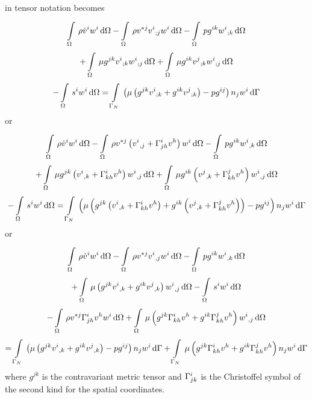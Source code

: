  in tensor notation becomes
\begin{multline}
  \gint{\Omega}{}{\rho\dot{v}^{i}w^{i}}{\Omega}
 -\gint{\Omega}{}{\rho v^{*j}\covarderiv{v^{i}}{j}w^{i}}{\Omega}
 -\gint{\Omega}{}{pg^{ik}\covarderiv{w^{i}}{k}}{\Omega}\\
 +\gint{\Omega}{}{{\mu}g^{jk}\covarderiv{v^{i}}{k}\covarderiv{w^{i}}{j}}{\Omega}
 +\gint{\Omega}{}{{\mu}g^{ik}\covarderiv{v^{j}}{k}\covarderiv{w^{i}}{j}}{\Omega}\\
 -\gint{\Omega}{}{s^{i}w^{i}}{\Omega}
 =\gint{\Gamma_N}{}{\pbrac{\mu\pbrac{g^{jk}\covarderiv{v^{i}}{k}+g^{ik}\covarderiv{v^{j}}{k}}-pg^{ij}}n_{j}w^{i}}{\Gamma}
 \label{eqn:TensorStokesEquation}
\end{multline}
or
\begin{multline}
  \gint{\Omega}{}{\rho\dot{v}^{i}w^{i}}{\Omega}
 -\gint{\Omega}{}{\rho v^{*j}\pbrac{\partialderiv{v^{i}}{j}+\christoffel{i}{j}{h}v^{h}}w^{i}}{\Omega}
 -\gint{\Omega}{}{pg^{ik}\partialderiv{w^{i}}{k}}{\Omega}\\
 +\gint{\Omega}{}{{\mu}g^{jk}\pbrac{\partialderiv{v^{i}}{k}+\christoffel{i}{k}{h}v^{h}}\partialderiv{w^{i}}{j}}{\Omega}
 +\gint{\Omega}{}{{\mu}g^{ik}\pbrac{\partialderiv{v^{j}}{k}+\christoffel{j}{k}{h}v^{h}}\partialderiv{w^{i}}{j}}{\Omega}\\
 -\gint{\Omega}{}{s^{i}w^{i}}{\Omega}
 =\gint{\Gamma_N}{}{\pbrac{\mu\pbrac{g^{jk}\pbrac{\partialderiv{v^{i}}{k}+\christoffel{i}{k}{h}v^{h}}+g^{ik}\pbrac{\partialderiv{v^{j}}{k}+\christoffel{j}{k}{h}v^{h}}}-pg^{ij}}n_{j}w^{i}}{\Gamma}
 \label{eqn:Tensor2StokesEquation}
\end{multline}
or
\begin{multline}
  \gint{\Omega}{}{\rho\dot{v}^{i}w^{i}}{\Omega}
 -\gint{\Omega}{}{\rho v^{*j}\partialderiv{v^{i}}{j}w^{i}}{\Omega}
 -\gint{\Omega}{}{pg^{ik}\partialderiv{w^{i}}{k}}{\Omega}\\
 +\gint{\Omega}{}{\mu\pbrac{g^{jk}\partialderiv{v^{i}}{k}+g^{ik}\partialderiv{v^{j}}{k}}\partialderiv{w^{i}}{j}}{\Omega}
 -\gint{\Omega}{}{s^{i}w^{i}}{\Omega} \\
 -\gint{\Omega}{}{\rho v^{*j}\christoffel{i}{j}{h}v^{h}w^{i}}{\Omega}
 +\gint{\Omega}{}{\mu\pbrac{g^{jk}\christoffel{i}{k}{h}v^{h}+
     g^{ik}\christoffel{j}{k}{h}v^{h}}\partialderiv{w^{i}}{j}}{\Omega}\\
 =\gint{\Gamma_N}{}{\pbrac{\mu\pbrac{g^{jk}\partialderiv{v^{i}}{k}+g^{ik}\partialderiv{v^{j}}{k}}-pg^{ij}}n_{j}w^{i}}{\Gamma}
 +\gint{\Gamma_N}{}{\mu\pbrac{g^{jk}\christoffel{i}{k}{h}v^{h}+g^{ik}\christoffel{j}{k}{h}v^{h}}n_{j}w^{i}}{\Gamma}
 \label{eqn:Tensor3StokesEquation}
\end{multline}
where $g^{jk}$ is the contravariant metric tensor and $ \Gamma^{i}_{jk} $
is the Christoffel symbol of the second kind for the spatial coordinates.

